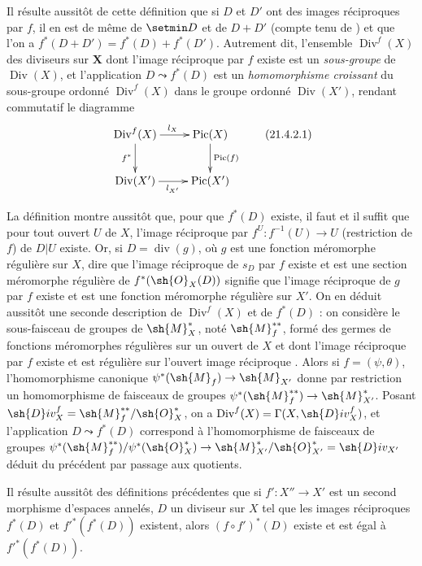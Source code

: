Il résulte aussitôt de cette définition que si $D$ et $D'$ ont des images réciproques par $f$, il en est de même de $\setmin D$ et de $D+D'$ (compte tenu de ) et que l'on a
$f^*(D+D')=f^*(D)+f^*(D')$.
Autrement dit, l'ensemble $\operatorname{Div}^f(X)$ des diviseurs sur $\mathbf{X}$ dont l'image réciproque par $f$ existe est un \emph{sous-groupe} de $\operatorname{Div}(X)$, et l'application $D\leadsto f^*(D)$ est un \emph{homomorphisme croissant} du sous-groupe ordonné $\operatorname{Div}^f(X)$ dans le groupe ordonné $\operatorname{Div}(X')$, rendant commutatif le diagramme
\[
\label{IV.21.4.2.1}
  \xymatrix{
    \operatorname{Div}^f(X) \ar[r]^{l_X} \ar[d]_{f^*} & \operatorname{Pic}(X) \ar[d]^{\operatorname{Pic}(f)} \\
    \operatorname{Div}(X') \ar[r]_{l_{X'}} & \operatorname{Pic}(X')
  }
  \tag{21.4.2.1}
\]

\begin{env}[21.4.3]
\label{IV.21.4.3}
La définition  montre aussitôt que, pour que $f^*(D)$ existe, il faut et il suffit que pour tout ouvert $U$ de $X$, l'image réciproque par $f^U:f^{-1}(U)\to U$ (restriction de $f$) de $D|U$ existe.
Or, si $D=\operatorname{div}(g)$, où $g$ est une fonction méromorphe régulière sur $X$, dire que l'image réciproque de $s_D$ par $f$ existe et est une section méromorphe régulière de $f^*(\sh{O}_X(D))$ signifie  que l'image réciproque de $g$ par $f$ existe et est une fonction méromorphe régulière sur $X'$.
On en déduit aussitôt une seconde description de $\operatorname{Div}^f(X)$ et de $f^*(D)$ : on considère le sous-faisceau de groupes de $\sh{M}_X^*$, noté $\sh{M}_f^{**}$, formé des germes de fonctions méromorphes régulières sur un ouvert de $X$ et dont l'image réciproque par $f$ existe et est régulière sur l'ouvert image réciproque .
Alors si $f=(\psi,\theta)$, l'homomorphisme canonique  $\psi^*(\sh{M}_f)\to\sh{M}_{X'}$ donne par restriction un homomorphisme de faisceaux de groupes $\psi^*(\sh{M}_f^{**})\to\sh{M}_{X'}^*$.
Posant $\sh{D}iv_X^f=\sh{M}_f^{**}/\sh{O}_X^*$, on a $\operatorname{Div}^f(X)=\Gamma(X,\sh{D}iv_X^f)$, et l'application $D\leadsto f^*(D)$ correspond à l'homomorphisme de faisceaux de groupes $\psi^*(\sh{M}_f^{**})/\psi^*(\sh{O}_X^*)\to\sh{M}_{X'}^*/\sh{O}_{X'}^*=\sh{D}iv_{X'}$ déduit du précédent par passage aux quotients.
\end{env}

\begin{env}[21.4.4]
Il résulte aussitôt des définitions précédentes que si $f':X''\to X'$ est un second morphisme d'espaces annelés, $D$ un diviseur sur $X$ tel que les images réciproques $f^*(D)$ et $f'^*(f^*(D))$ existent, alors $(f\circ f')^*(D)$ existe et est égal à $f'^*(f^*(D))$.
\end{env}

